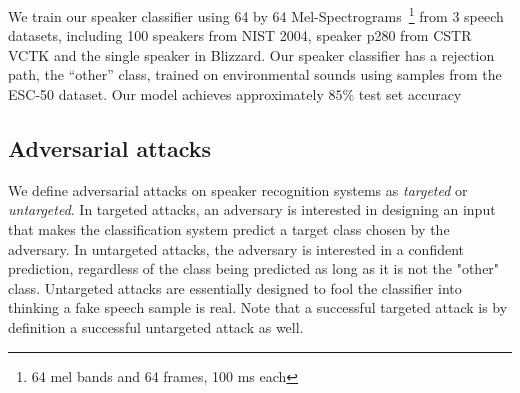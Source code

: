 We train our speaker classifier using 64 by 64 Mel-Spectrograms~\footnote{64 mel
bands and 64 frames, 100 ms each} from 3 speech datasets, including 100 speakers
from NIST 2004, speaker p280 from CSTR VCTK and the single speaker in Blizzard.
Our speaker classifier has a rejection path, the “other” class, trained on
environmental sounds using samples from the ESC-50 dataset. Our model achieves
approximately $85\%$ test set accuracy

\subsection{Adversarial attacks}
We define adversarial attacks on speaker recognition systems as
\textit{targeted} or \textit{untargeted}. In targeted attacks, an adversary is
interested in designing an input that makes the classification system predict a
target class chosen by the adversary. In untargeted attacks, the adversary is
interested in a confident prediction, regardless of the class being predicted as
long as it is not the "other" class.  Untargeted attacks are essentially designed
to fool the classifier into thinking a fake speech sample is real. Note that a
successful targeted attack is by definition a successful untargeted attack as
well.
